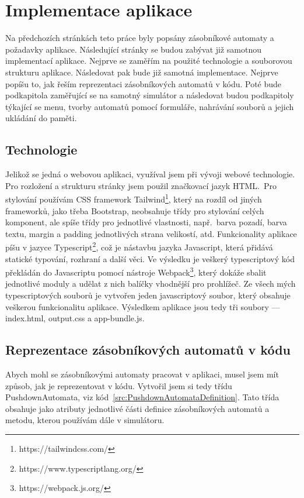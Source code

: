 \chapter{Implementace aplikace}\label{chap:AppImplemetation}

Na předchozích stránkách teto práce byly popsány zásobníkové automaty a požadavky aplikace. Následující stránky se budou zabývat již samotnou implementací aplikace. Nejprve se zaměřím na použité technologie a souborovou strukturu aplikace. Následovat pak bude již samotná implementace. Nejprve popíšu to, jak řeším reprezentaci zásobníkových automatů v kódu. Poté bude podkapitola zaměřující se na samotný simulátor a následovat budou podkapitoly týkající se menu, tvorby automatů pomocí formuláře, nahrávání souborů a jejich ukládání do paměti.

\section{Technologie}

Jelikož se jedná o webovou aplikaci, využíval jsem při vývoji webové technologie. Pro rozložení a strukturu stránky jsem použil značkovací jazyk HTML.\ Pro stylování používám CSS framework Tailwind\footnote{https://tailwindcss.com/}, který na rozdíl od jiných frameworků, jako třeba Bootstrap, neobsahuje třídy pro stylování celých komponent, ale spíše třídy pro jednotlivé vlastnosti, např.~barva pozadí, barva textu, margin a padding jednotlivých strana velikostí, atd. Funkcionality aplikace píšu v jazyce Typescript\footnote{https://www.typescriptlang.org/}, což je nástavbu jazyka Javascript, která přidává statické typování, rozhraní a další věci.\cite{Kvapil2018} Ve výsledku je veškerý typescriptový kód překládán do Javascriptu pomocí nástroje Webpack\footnote{https://webpack.js.org/}, který dokáže sbalit jednotlivé moduly a udělat z nich balíčky vhodnější pro prohlížeč.\cite{Janca2017} Ze všech mých typescriptových souborů je vytvořen jeden javascriptový soubor, který obsahuje veškerou funkcionalitu aplikace. Výsledkem aplikace jsou tedy tři soubory --- index.html, output.css a app-bundle.js.

\section{Reprezentace zásobníkových automatů v kódu}

Abych mohl se zásobníkovými automaty pracovat v aplikaci, musel jsem mít způsob, jak je reprezentovat v kódu. Vytvořil jsem si tedy třídu PushdownAutomata, viz kód~\ref{src:PushdownAutomataDefinition}. Tato třída obsahuje jako atributy jednotlivé části definice zásobníkových automatů a metodu, kterou používám dále v simulátoru.

